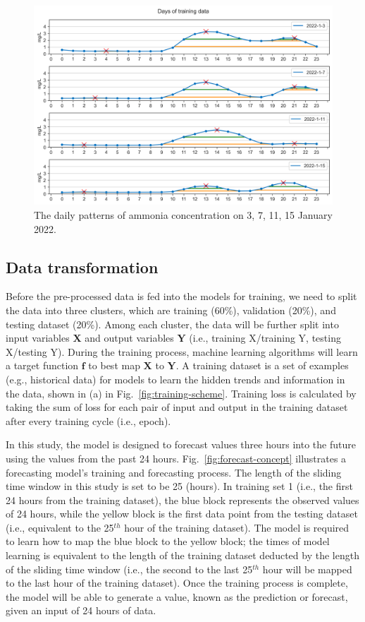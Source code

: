 \begin{figure}[!ht]
  \centering
  \includegraphics[width=0.8\columnwidth]{imgs/results/nh3-pattern.png}
  \caption{The daily patterns of ammonia concentration on 3, 7, 11, 15 January 2022.}
  \label{fig:nh3-peak-pattern}
\end{figure}


\subsection{Data transformation}
Before the pre-processed data is fed into the models for training, we need to split the data into three clusters, which are training (60\%), validation (20\%), and testing dataset (20\%). Among each cluster, the data will be further split into input variables $\bm{X}$ and output variables $\bm{Y}$ (i.e., training X/training Y, testing X/testing Y). During the training process, machine learning algorithms will learn a target function $\bm{f}$ to best map $\bm{X}$ to $\bm{Y}$. A training dataset is a set of examples (e.g., historical data) for models to learn the hidden trends and information in the data, shown in (a) in Fig.~\ref{fig:training-scheme}. Training loss is calculated by taking the sum of loss for each pair of input and output in the training dataset after every training cycle (i.e., epoch).

In this study, the model is designed to forecast values three hours into the future using the values from the past 24 hours. Fig.~\ref{fig:forecast-concept} illustrates a forecasting model's training and forecasting process. The length of the sliding time window in this study is set to be 25 (hours). In training set 1 (i.e., the first 24 hours from the training dataset), the blue block represents the observed values of 24 hours, while the yellow block is the first data point from the testing dataset (i.e., equivalent to the 25$^{th}$ hour of the training dataset). The model is required to learn how to map the blue block to the yellow block; the times of model learning is equivalent to the length of the training dataset deducted by the length of the sliding time window (i.e., the second to the last 25$^{th}$ hour will be mapped to the last hour of the training dataset). Once the training process is complete, the model will be able to generate a value, known as the prediction or forecast, given an input of 24 hours of data. 

